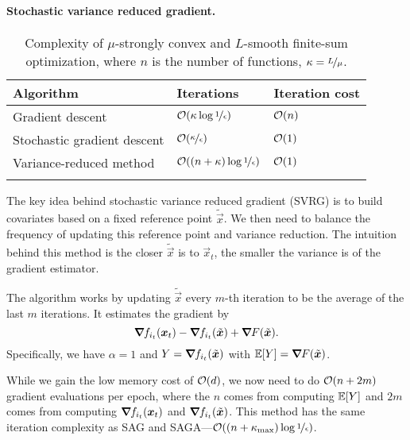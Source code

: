 \paragraph{Stochastic variance reduced gradient.}

\begin{table}[t]
    \centering
    \caption{Complexity of $\mu$-strongly convex and $L$-smooth finite-sum optimization, where $n$ is the number of functions, $\kappa = \nicefrac{L}{\mu}$.}
    \label{tab:vr}
    \begin{tabular}{lll} \toprule
        \textbf{Algorithm}          & \textbf{Iterations}                               & \textbf{Iteration cost} \\
        \midrule
        Gradient descent            & $\bigo{\kappa \log \nicefrac{1}{\epsilon}}$       & $\bigo{n}$              \\
        Stochastic gradient descent & $\bigo{\nicefrac{\kappa}{\epsilon}}$              & $\bigo{1}$              \\
        Variance-reduced method     & $\bigo{(n + \kappa) \log \nicefrac{1}{\epsilon}}$ & $\bigo{1}$              \\
        \bottomrule                                                                                               \\
    \end{tabular}
\end{table}

The key idea behind stochastic variance reduced gradient (SVRG) is to build covariates based on a
fixed reference point $\tilde{\vec{x}}$. We then need to balance the frequency of updating this
reference point and variance reduction. The intuition behind this method is the closer $\tilde{\vec{x}}$ is to $\vec{x}_t$,
the smaller the variance is of the gradient estimator.

The algorithm works by updating $\tilde{\vec{x}}$ every $m$-th iteration to be the average of the
last $m$ iterations. It estimates the gradient by \[
    \bm{\nabla}_{\! } f_{i_t}(\bm{x}_t) - \bm{\nabla}_{\! } f_{i_t}(\tilde{\bm{x}}) + \bm{\nabla}_{\! } F(\tilde{\bm{x}}).
\]
Specifically, we have $\alpha=1$ and $Y=\bm{\nabla}_{\! } f_{i_t}(\tilde{\bm{x}})$ with $\mathbb{E}[Y] =
    \bm{\nabla}_{\! } F(\tilde{\bm{x}})$.

While we gain the low memory cost of $\bigo{d}$, we now need to do $\bigo{n+2m}$ gradient
evaluations per epoch, where the $n$ comes from computing $\mathbb{E}[Y]$ and $2m$ comes from computing
$\bm{\nabla}_{\! } f_{i_t}(\bm{x}_t)$ and $\bm{\nabla}_{\! } f_{i_t}(\tilde{\bm{x}})$. This method has the same
iteration complexity as SAG and SAGA---$\bigo{(n + \kappa_{\max})\log \nicefrac{1}{\epsilon}}$.
